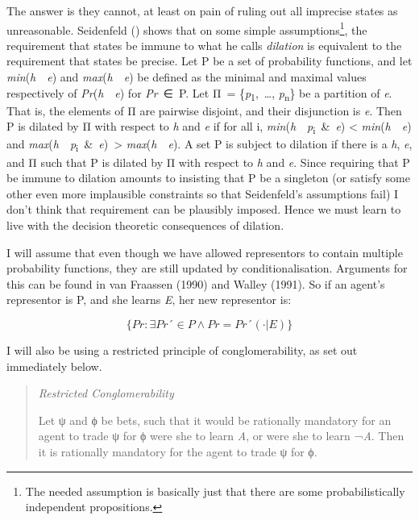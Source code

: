 \documentclass[
  10pt,
  letterpaper,
  DIV=11,
  numbers=noendperiod,
  twoside]{scrartcl}
\begin{document}
The answer is they cannot, at least on pain of ruling out all imprecise
states as unreasonable. Seidenfeld ()
shows that on some simple assumptions\footnote{The needed assumption is
  basically just that there are some probabilistically independent
  propositions.}, the requirement that states be immune to what he calls
\emph{dilation} is equivalent to the requirement that states be precise.
Let P be a set of probability functions, and let
\emph{min}(\emph{h}~\textbar~\emph{e}) and
\emph{max}(\emph{h}~\textbar~\emph{e}) be defined as the minimal and
maximal values respectively of \emph{Pr}(\emph{h}~\textbar~\emph{e}) for
\emph{Pr}~∈~P. Let Π~= \{\emph{p}\textsubscript{1},~\ldots,
\emph{p}\textsubscript{n}\} be a partition of \emph{e}. That is, the
elements of Π are pairwise disjoint, and their disjunction is \emph{e}.
Then P is dilated by Π with respect to \emph{h} and \emph{e} if for all
i, \emph{min}(\emph{h}~\textbar~\emph{p}\textsubscript{i}~\&~\emph{e})
\textless{} \emph{min}(\emph{h}~\textbar~\emph{e}) and
\emph{max}(\emph{h}~\textbar~\emph{p}\textsubscript{i}~\&~\emph{e})~\textgreater{}
\emph{max}(\emph{h}~\textbar~\emph{e}). A set P is subject to dilation
if there is a \emph{h}, \emph{e}, and Π such that P is dilated by Π with
respect to \emph{h} and \emph{e}. Since requiring that P be immune to
dilation amounts to insisting that P be a singleton (or satisfy some
other even more implausible constraints so that Seidenfeld's assumptions
fail) I don't think that requirement can be plausibly imposed. Hence we
must learn to live with the decision theoretic consequences of dilation.

I will assume that even though we have allowed representors to contain
multiple probability functions, they are still updated by
conditionalisation. Arguments for this can be found in van Fraassen
(1990) and Walley (1991). So if an agent's representor is P, and she
learns \emph{E}, her new representor is:

\[
\{Pr: \exists Pr´ \in P \wedge Pr = Pr´( \cdot | E)\}
\]

I will also be using a restricted principle of conglomerability, as set
out immediately below.

\begin{quote}
\emph{Restricted Conglomerability}

Let ψ and ϕ be bets, such that it would be rationally mandatory for an
agent to trade ψ for ϕ were she to learn \emph{A}, or were she to learn
¬\emph{A}. Then it is rationally mandatory for the agent to trade ψ for
ϕ.
\end{quote}
\end{document}
